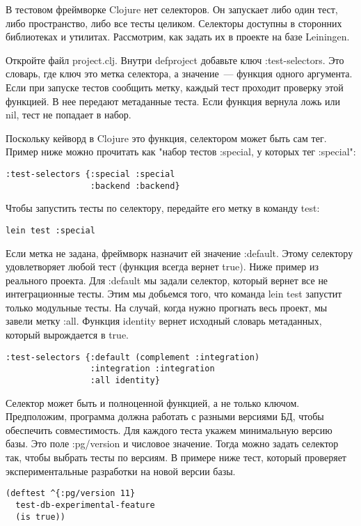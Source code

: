 В тестовом фреймворке Clojure нет селекторов. Он запускает либо один тест, либо
пространство, либо все тесты целиком. Селекторы доступны в сторонних библиотеках
и утилитах. Рассмотрим, как задать их в проекте на базе Leiningen.

Откройте файл project.clj. Внутри defproject добавьте ключ :test-selectors. Это
словарь, где ключ это метка селектора, а значение~--- функция одного
аргумента. Если при запуске тестов сообщить метку, каждый тест проходит проверку
этой функцией. В нее передают метаданные теста. Если функция вернула ложь или
nil, тест не попадает в набор.

Поскольку кейворд в Clojure это функция, селектором может быть сам тег. Пример
ниже можно прочитать как "набор тестов :special, у которых тег :special":

\begin{verbatim}
:test-selectors {:special :special
                 :backend :backend}
\end{verbatim}

Чтобы запустить тесты по селектору, передайте его метку в команду test:

\begin{verbatim}
lein test :special
\end{verbatim}

Если метка не задана, фреймворк назначит ей значение :default. Этому селектору
удовлетворяет любой тест (функция всегда вернет true). Ниже пример из реального
проекта. Для :default мы задали селектор, который вернет все не интеграционные
тесты. Этим мы добьемся того, что команда lein test запустит только модульные
тесты. На случай, когда нужно прогнать весь проект, мы завели метку
:all. Функция identity вернет исходный словарь метаданных, который вырождается в
true.

\begin{verbatim}
:test-selectors {:default (complement :integration)
                 :integration :integration
                 :all identity}
\end{verbatim}

Селектор может быть и полноценной функцией, а не только ключом. Предположим,
программа должна работать с разными версиями БД, чтобы обеспечить
совместимость. Для каждого теста укажем минимальную версию базы. Это поле
:pg/version и числовое значение. Тогда можно задать селектор так, чтобы выбрать
тесты по версиям. В примере ниже тест, который проверяет экспериментальные
разработки на новой версии базы.

\begin{verbatim}
(deftest ^{:pg/version 11}
  test-db-experimental-feature
  (is true))
\end{verbatim}

